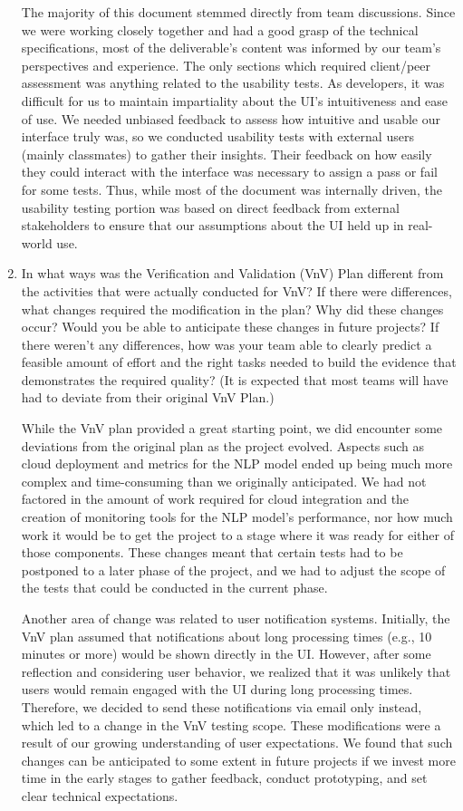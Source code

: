 \documentclass[12pt, titlepage]{article}
\begin{document}
\begin{enumerate}
  The majority of this document stemmed directly from team discussions. 
  Since we were working closely together and had a good grasp of the 
  technical specifications, most of the deliverable's content was informed 
  by our team's perspectives and experience. The only sections which required 
  client/peer assessment was anything related to the usability tests. As developers, 
  it was difficult for us to maintain impartiality about the UI's intuitiveness and 
  ease of use. We needed unbiased feedback to assess how intuitive and usable our 
  interface truly was, so we conducted usability tests with external users 
  (mainly classmates) to gather their insights. Their feedback on how easily they 
  could interact with the interface was necessary to assign a pass or fail for some tests. 
  Thus, while most of the document was internally driven, the usability testing portion 
  was based on direct feedback from external stakeholders to ensure that our assumptions 
  about the UI held up in real-world use.

  \item In what ways was the Verification and Validation (VnV) Plan different
  from the activities that were actually conducted for VnV?  If there were
  differences, what changes required the modification in the plan?  Why did
  these changes occur?  Would you be able to anticipate these changes in future
  projects?  If there weren't any differences, how was your team able to clearly
  predict a feasible amount of effort and the right tasks needed to build the
  evidence that demonstrates the required quality?  (It is expected that most
  teams will have had to deviate from their original VnV Plan.)

While the VnV plan provided a great starting point, we did encounter some 
deviations from the original plan as the project evolved. Aspects such as cloud 
deployment and metrics for the NLP model ended up being much more complex and 
time-consuming than we originally anticipated. We had not factored in the 
amount of work required for cloud integration and the creation of monitoring 
tools for the NLP model's performance, nor how much work it would be to get 
the project to a stage where it was ready for either of those components. These changes 
meant that certain tests had to be postponed to a later phase of the project, and we had to 
adjust the scope of the tests that could be conducted in the current phase.

Another area of change was related to user notification systems. Initially, the VnV 
plan assumed that notifications about long processing times (e.g., 10 minutes or more) 
would be shown directly in the UI. However, after some reflection and considering user 
behavior, we realized that it was unlikely that users would remain engaged with the UI 
during long processing times. Therefore, we decided to send these notifications via 
email only instead, which led to a change in the VnV testing scope. These modifications were 
a result of our growing understanding of user expectations. We found that such changes 
can be anticipated to some extent in future projects if we invest more time in the 
early stages to gather feedback, conduct prototyping, and set clear technical expectations.


\end{enumerate}
\end{document}
